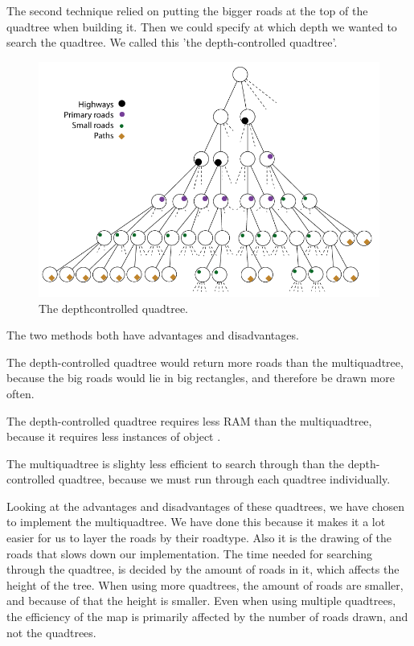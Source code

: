 The second technique relied on putting the bigger roads at the top of the
quadtree when building it. Then we could specify at which depth we wanted to
search the quadtree. We called this 'the depth-controlled quadtree'.

\begin{figure}[h!]
\centering
\includegraphics[width=1\linewidth]{images/DepthcontrolledQuadtree.png}
\caption{The depthcontrolled quadtree.}
\label{IMPL-DCQ}
\end{figure}

The two methods both have advantages and disadvantages.

The depth-controlled quadtree would return more roads than the multiquadtree,
because the big roads would lie in big rectangles, and therefore be drawn more
often.

The depth-controlled quadtree requires less RAM than the multiquadtree,
because it requires less instances of object .

The multiquadtree is slighty less efficient to search through than the
depth-controlled quadtree, because we must run through each quadtree
individually.

Looking at the advantages and disadvantages of these quadtrees, we have chosen
to implement the multiquadtree. We have done this because it makes it a lot easier for 
us to layer the roads by their roadtype. Also it is the drawing of the roads that slows 
down our implementation. The time needed for searching through the quadtree, is 
decided by the amount of roads in it, which affects the height of the tree. When using 
more quadtrees, the amount of roads are smaller, and because of that the height is 
smaller. Even when using multiple quadtrees, the efficiency of the map is primarily 
affected by the number of roads drawn, and not the quadtrees.

